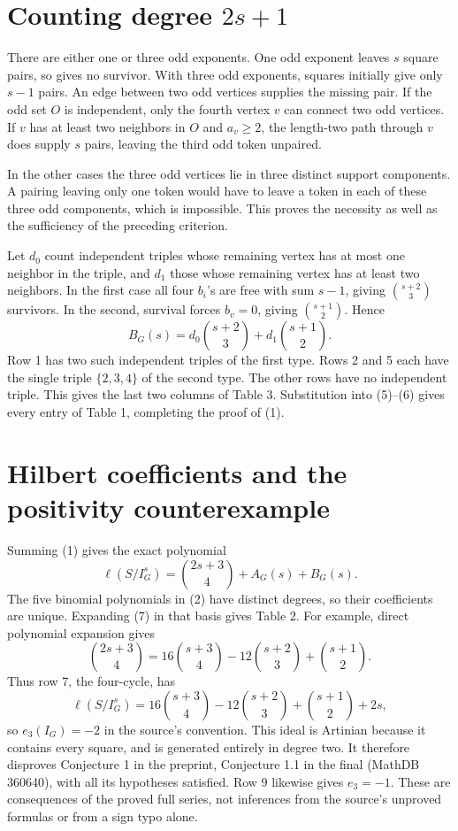 \documentclass[11pt]{article}
\newcommand{\bin}[2]{\binom{#1}{#2}}
\begin{document}
\section*{Counting degree \(2s+1\)}
There are either one or three odd exponents. One odd exponent
leaves \(s\) square pairs, so gives no survivor. With three odd
exponents, squares initially give only \(s-1\) pairs. An edge
between two odd vertices supplies the missing pair. If the odd
set \(O\) is independent, only the fourth vertex \(v\) can
connect two odd vertices. If \(v\) has at least two neighbors
in \(O\) and \(a_v\geq2\), the length-two path through \(v\)
does supply \(s\) pairs, leaving the third odd token unpaired.

In the other cases the three odd vertices lie in three distinct
support components. A pairing leaving only one token would have
to leave a token in each of these three odd components, which is
impossible. This proves the necessity as well as the sufficiency
of the preceding criterion.

Let \(d_0\) count independent triples whose remaining vertex has
at most one neighbor in the triple, and \(d_1\) those whose remaining
vertex has at least two neighbors. In the first case all four
\(b_i\)'s are free with sum \(s-1\), giving \(\bin{s+2}{3}\)
survivors. In the second, survival forces \(b_v=0\), giving
\(\bin{s+1}{2}\). Hence
\[
 B_G(s)=d_0\bin{s+2}{3}+d_1\bin{s+1}{2}.                    \tag{6}
\]
Row 1 has two such independent triples of the first type. Rows 2
and 5 each have the single triple \(\{2,3,4\}\) of the second
type. The other rows have no independent triple. This gives the
last two columns of Table 3. Substitution into (5)--(6) gives
every entry of Table 1, completing the proof of (1).

\section*{Hilbert coefficients and the positivity counterexample}
Summing (1) gives the exact polynomial
\[
          \ell(S/I_G^s)=\bin{2s+3}{4}+A_G(s)+B_G(s).         \tag{7}
\]
The five binomial polynomials in (2) have distinct degrees, so their
coefficients are unique. Expanding (7) in that basis gives Table 2.
For example, direct polynomial expansion gives
\[
 \bin{2s+3}{4}=16\bin{s+3}{4}-12\bin{s+2}{3}+\bin{s+1}{2}.
\]
Thus row 7, the four-cycle, has
\[
 \ell(S/I_G^s)=16\bin{s+3}{4}-12\bin{s+2}{3}
                         +\bin{s+1}{2}+2s,
\]
so \(e_3(I_G)=-2\) in the source's convention. This ideal is
Artinian because it contains every square, and is generated
entirely in degree two. It therefore disproves Conjecture 1 in
the preprint, Conjecture 1.1 in the final (MathDB 360640), with
all its hypotheses satisfied. Row 9 likewise gives \(e_3=-1\).
These are consequences of the proved full series, not inferences
from the source's unproved formulas or from a sign typo alone.
\end{document}
